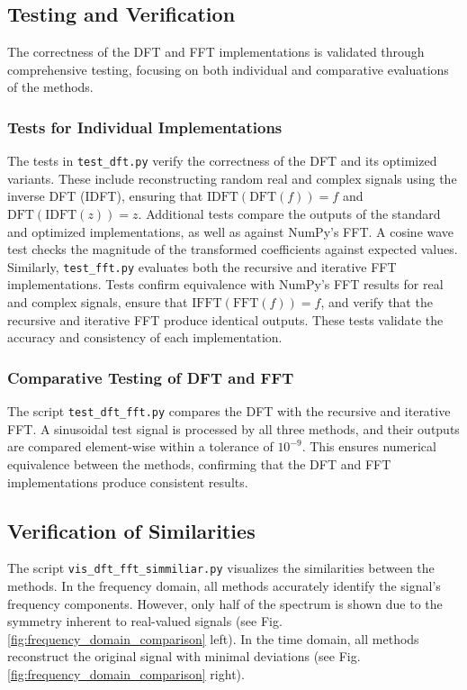 \documentclass[12pt, a4paper]{report}
\begin{document}
\subsection{Testing and Verification}
The correctness of the \ac{DFT} and \ac{FFT} implementations is validated through comprehensive testing, focusing on both individual and comparative evaluations of the methods.

\subsubsection{Tests for Individual Implementations}
The tests in \texttt{test\_dft.py} verify the correctness of the \ac{DFT} and its optimized variants. These include reconstructing random real and complex signals using the inverse \ac{DFT} (IDFT), ensuring that \( \text{IDFT}(\text{DFT}(f)) = f \) and \( \text{DFT}(\text{IDFT}(z)) = z \). Additional tests compare the outputs of the standard and optimized implementations, as well as against NumPy's FFT. A cosine wave test checks the magnitude of the transformed coefficients against expected values.\\
Similarly, \texttt{test\_fft.py} evaluates both the recursive and iterative FFT implementations. Tests confirm equivalence with NumPy's FFT results for real and complex signals, ensure that \( \text{IFFT}(\text{FFT}(f)) = f \), and verify that the recursive and iterative FFT produce identical outputs. These tests validate the accuracy and consistency of each implementation.

\subsubsection{Comparative Testing of \ac{DFT} and \ac{FFT}}
The script \texttt{test\_dft\_fft.py} compares the \ac{DFT} with the recursive and iterative FFT. A sinusoidal test signal is processed by all three methods, and their outputs are compared element-wise within a tolerance of \(10^{-9}\). This ensures numerical equivalence between the methods, confirming that the \ac{DFT} and FFT implementations produce consistent results.

\subsection{Verification of Similarities}
The script \texttt{vis\_dft\_fft\_simmiliar.py} visualizes the similarities between the methods. In the frequency domain, all methods accurately identify the signal's frequency components. However, only half of the spectrum is shown due to the symmetry inherent to real-valued signals (see Fig. \ref{fig:frequency_domain_comparison} left). In the time domain, all methods reconstruct the original signal with minimal deviations (see Fig. \ref{fig:frequency_domain_comparison} right).
\end{document}

